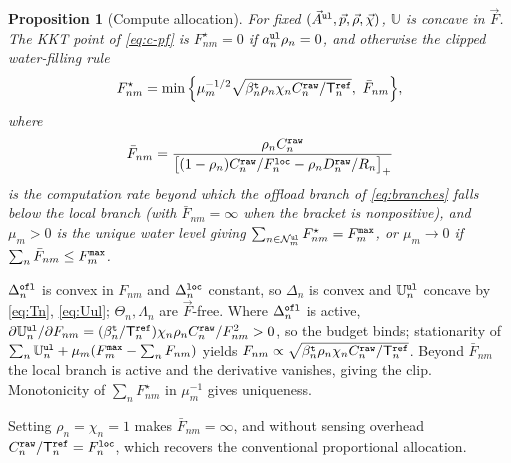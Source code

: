\documentclass[journal]{IEEEtran}
\newtheorem{proposition}{Proposition}
\begin{document}
\begin{proposition}[Compute allocation]\label{prop:F}
For fixed $(\vec{A}^{\tt ul},\vec{p},\vec{\rho},\vec{\chi})$, $\mathbb{U}$ is concave in $\vec{F}$. The KKT point of \eqref{eq:c-pf} is $F_{nm}^\star=0$ if $a_n^{\tt ul}\rho_n=0$, and otherwise the clipped water-filling rule
\begin{equation}
F_{nm}^\star
=\min\Big\{\mu_m^{-1/2}\sqrt{\beta_n^{\tt t}\rho_n\chi_n C_n^{\tt raw}/\mathsf{T}_n^{\tt ref}},\ \bar F_{nm}\Big\},
\label{eq:Fstar}
\end{equation}
where
\begin{equation}
\bar F_{nm}
=\frac{\rho_n C_n^{\tt raw}}
{\big[(1-\rho_n)C_n^{\tt raw}/F_n^{\tt loc}-\rho_n D_n^{\tt raw}/R_n\big]_+}
\label{eq:Fbar}
\end{equation}
is the {\color{blue}computation  rate} beyond which the offload branch of \eqref{eq:branches} falls below the local branch (with $\bar F_{nm}=\infty$ when the bracket is nonpositive), and $\mu_m>0$ is the unique water level giving $\sum_{n\in\mathcal{N}_m^{\tt ul}}F_{nm}^\star=F_m^{\tt max}$, or $\mu_m\to0$ if $\sum_n\bar F_{nm}\le F_m^{\tt max}$.
\end{proposition}
\begin{IEEEproof}
$\Delta_n^{\tt ofl}$ is convex in $F_{nm}$ and $\Delta_n^{\tt loc}$ constant, so $\Delta_n$ is convex and $\mathbb{U}_n^{\tt ul}$ concave by \eqref{eq:Tn}, \eqref{eq:Uul}; $\Theta_n,\Lambda_n$ are $\vec{F}$-free. Where $\Delta_n^{\tt ofl}$ is active, $\partial\mathbb{U}_n^{\tt ul}/\partial F_{nm}=(\beta_n^{\tt t}/\mathsf{T}_n^{\tt ref})\chi_n\rho_n C_n^{\tt raw}/F_{nm}^2>0$, so the budget binds; stationarity of $\sum_n\mathbb{U}_n^{\tt ul}+\mu_m(F_m^{\tt max}-\sum_n F_{nm})$ yields $F_{nm}\propto\sqrt{\beta_n^{\tt t}\rho_n\chi_n C_n^{\tt raw}/\mathsf{T}_n^{\tt ref}}$. Beyond $\bar F_{nm}$ the local branch is active and the derivative vanishes, giving the clip. Monotonicity of $\sum_n F_{nm}^\star$ in $\mu_m^{-1}$ gives uniqueness.
\end{IEEEproof}
Setting $\rho_n=\chi_n=1$ makes $\bar F_{nm}=\infty$, and without sensing overhead $C_n^{\tt raw}/\mathsf{T}_n^{\tt ref}=F_n^{\tt loc}$, which recovers the conventional proportional allocation.
\end{document}
